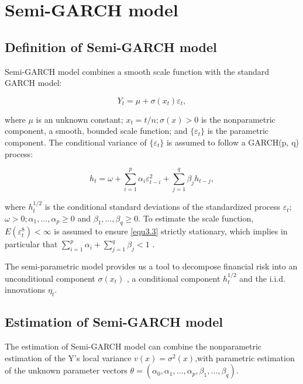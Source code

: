 \section{Semi-GARCH model}

\subsection{Definition of Semi-GARCH model}

Semi-GARCH model combines a smooth scale function with the standard GARCH model:

\begin{equation}
\label{eq:3.1}
Y_{t} = \mu + \sigma(x_{t})\varepsilon_{t},
\end{equation}

where $\mu$ is an unknown constant; $x_{t}=t/n; \sigma(x)>0$ is the nonparametric component, a smooth, bounded scale function; and $\lbrace\varepsilon_{t}\rbrace$ is the parametric component. The conditional variance of $\lbrace\varepsilon_{t}\rbrace$ is assumed to follow a GARCH(p, q) process:

\begin{equation}
\label{equ3.3}
h_{t}=\omega + \sum_{i=1}^{p}\alpha_{i}\varepsilon_{t-i}^{2} + \sum_{j=1}^{q}\beta_{j}h_{t-j},
\end{equation}

where $h_t^{1/2}$ is the conditional standard deviations of the standardized process $\varepsilon_t$; $ \omega>0; \alpha_{1}, \ldots ,\alpha_{p}\geq0$ and $\beta_{1},\ldots,\beta_{q}\geq0$.  To estimate the scale function, $E(\varepsilon_{t}^{8})<\infty$ is assumed to ensure \ref{equ3.3} strictly stationary, which implies in particular that $\sum_{i=1}^p\alpha_i+\sum_{j=1}^q\beta_j<1$ \citep{Feng2004}.

The semi-parametric model provides us a tool to decompose financial risk into an unconditional component $\sigma(x_t)$ , a conditional component $h_{t}^{1/2}$ and the i.i.d. innovations $\eta_{t}$.

\subsection{Estimation of Semi-GARCH model}
\label{subsec3.1.2}
The estimation of Semi-GARCH model can combine the nonparametric estimation of the Y's local variance $v(x)=\sigma^{2}(x)$,with parametric estimation of the unknown parameter vectors $\theta = (\alpha_{0},\alpha_{1},\ldots,\alpha_{p},\beta_{1},\ldots,\beta_{q})$.

